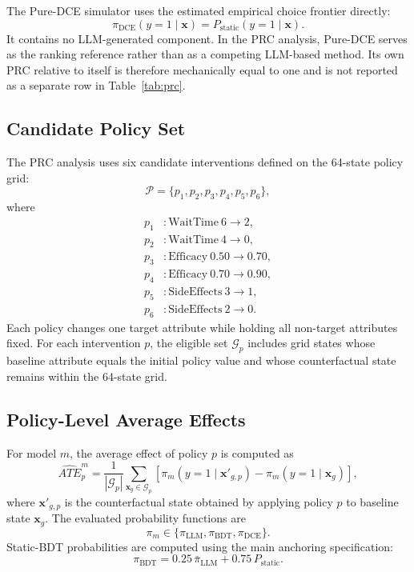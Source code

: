 \documentclass[11pt]{article}
\begin{document}
The Pure-DCE simulator uses the estimated empirical choice frontier directly:
\[
\pi_{\mathrm{DCE}}(y=1\mid \mathbf{x})
=
P_{\mathrm{static}}(y=1\mid \mathbf{x}).
\]
It contains no LLM-generated component. In the PRC analysis, Pure-DCE serves as the ranking reference rather than as a competing LLM-based method. Its own PRC relative to itself is therefore mechanically equal to one and is not reported as a separate row in Table~\ref{tab:prc}.

\subsection{Candidate Policy Set}

The PRC analysis uses six candidate interventions defined on the 64-state policy grid:
\[
\mathcal{P}
=
\{p_1,p_2,p_3,p_4,p_5,p_6\},
\]
where
\[
\begin{aligned}
p_1 &: \mathrm{WaitTime}\ 6 \rightarrow 2,\\
p_2 &: \mathrm{WaitTime}\ 4 \rightarrow 0,\\
p_3 &: \mathrm{Efficacy}\ 0.50 \rightarrow 0.70,\\
p_4 &: \mathrm{Efficacy}\ 0.70 \rightarrow 0.90,\\
p_5 &: \mathrm{SideEffects}\ 3 \rightarrow 1,\\
p_6 &: \mathrm{SideEffects}\ 2 \rightarrow 0.
\end{aligned}
\]
Each policy changes one target attribute while holding all non-target attributes fixed. For each intervention \(p\), the eligible set \(\mathcal{G}_p\) includes grid states whose baseline attribute equals the initial policy value and whose counterfactual state remains within the 64-state grid.

\subsection{Policy-Level Average Effects}

For model \(m\), the average effect of policy \(p\) is computed as
\[
\widehat{ATE}_{p}^{m}
=
\frac{1}{|\mathcal{G}_p|}
\sum_{\mathbf{x}_g \in \mathcal{G}_p}
\left[
\pi_{m}(y=1\mid \mathbf{x}'_{g,p})
-
\pi_{m}(y=1\mid \mathbf{x}_g)
\right],
\]
where \(\mathbf{x}'_{g,p}\) is the counterfactual state obtained by applying policy \(p\) to baseline state \(\mathbf{x}_g\). The evaluated probability functions are
\[
\pi_m
\in
\{
\pi_{\mathrm{LLM}},
\pi_{\mathrm{BDT}},
\pi_{\mathrm{DCE}}
\}.
\]
Static-BDT probabilities are computed using the main anchoring specification:
\[
\pi_{\mathrm{BDT}}
=
0.25\,\bar{\pi}_{\mathrm{LLM}}
+
0.75\,P_{\mathrm{static}}.
\]
\end{document}
